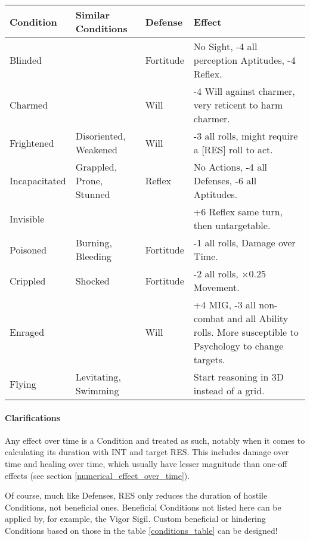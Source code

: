 \begin{table*}[h!tbp]
	\begin{center}
		\begin{tabular}{p{2.5cm}p{3.5cm}p{2cm}p{8cm}} \toprule
			
		    \textbf{Condition} & \textbf{Similar Conditions} & \textbf{Defense} & \textbf{Effect} \\ \midrule

		    Blinded & & Fortitude & No Sight, -4 all perception Aptitudes, -4 Reflex. \\[4mm] 
		    Charmed & & Will & -4 Will against charmer, very reticent to harm charmer. \\[4mm] 
		    Frightened & Disoriented, Weakened & Will & -3 all rolls, might require a [RES] roll to act. \\[4mm] 
            Incapacitated & Grappled, Prone, Stunned & Reflex & No Actions, -4 all Defenses, -6 all Aptitudes. \\[4mm]
			Invisible & & & +6 Reflex same turn, then untargetable. \\[4mm] 
            Poisoned & Burning, Bleeding & Fortitude & -1 all rolls, Damage over Time. \\[4mm] 
            Crippled & Shocked & Fortitude & -2 all rolls, $\times$0.25 Movement. \\[4mm] 
            Enraged & & Will & +4 MIG, -3 all non-combat and all Ability rolls. More susceptible to Psychology to change targets. \\[6mm] 
            Flying & Levitating, Swimming & & Start reasoning in 3D instead of a grid. \\[4mm] 

		    \bottomrule
		\end{tabular}
	\end{center}
	\caption{Conditions}
  \label{conditions_table}
\end{table*}

\paragraph{Clarifications} 

Any effect over time is a Condition and treated as such, notably when it comes to calculating its duration with INT and target RES. This includes damage over time and healing over time, which usually have lesser magnitude than one-off effects (see section \ref{numerical_effect_over_time}).

Of course, much like Defenses, RES only reduces the duration of hostile Conditions, not beneficial ones. Beneficial Conditions not listed here can be applied by, for example, the Vigor Sigil. Custom beneficial or hindering Conditions based on those in the table \ref{conditions_table} can be designed!


